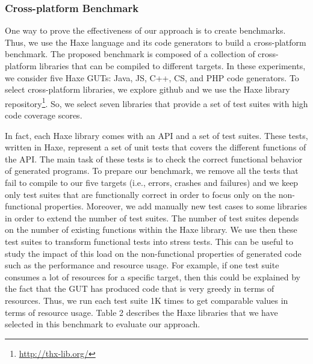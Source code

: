 \subsubsection{Cross-platform Benchmark}
One way to prove the effectiveness of our approach is to create benchmarks. Thus, we use the Haxe language and its code generators to build a cross-platform benchmark. The proposed benchmark is composed of a collection of cross-platform libraries that can be compiled to different targets. In these experiments, we consider five Haxe GUTs: Java, JS, C++, CS, and PHP code generators. To select cross-platform libraries, we explore github and we use the Haxe library repository\footnote{\url{http://thx-lib.org/}}. So, we select seven libraries that provide a set of test suites with high code coverage scores. 

In fact, each Haxe library comes with an API and a set of test suites. These tests, written in Haxe, represent a set of unit tests that covers the different functions of the API. The main task of these tests is to check the correct functional behavior of generated programs. To prepare our benchmark, we remove all the tests that fail to compile to our five targets (i.e., errors, crashes and failures) and we keep only test suites that are functionally correct in order to focus only on the non-functional properties.
Moreover, we add manually new test cases to some libraries in order to extend the number of test suites. The number of test suites depends on the number of existing functions within the Haxe library.
We use then these test suites to transform functional tests into stress tests. This can be useful to study the impact of this load on the non-functional properties of generated code such as the performance and resource usage. For example, if one test suite consumes a lot of resources for a specific target, then this could be explained by the fact that the GUT has produced code that is very greedy in terms of resources.
Thus, we run each test suite 1K times to get comparable values in terms of resource usage.
Table 2 describes the Haxe libraries that we have selected in this benchmark to evaluate our
approach.

